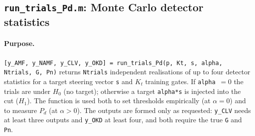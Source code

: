 \documentclass{article}
\begin{document}
\subsection{\texttt{run\_trials\_Pd.m}: Monte Carlo detector statistics}\label{sec:code:trials}

\paragraph{Purpose.} \texttt{[y\_AMF, y\_NAMF, y\_CLV, y\_OKD] = run\_trials\_Pd(p, Kt, s, alpha, Ntrials, G, Pn)} returns \texttt{Ntrials} independent realisations of up to four detector statistics for a target steering vector \texttt{s} and $K_t$ training gates. If \texttt{alpha}~$=0$ the trials are under $H_0$ (no target); otherwise a target \texttt{alpha*s} is injected into the \gls{cut} ($H_1$). The function is used both to set thresholds empirically (at $\alpha=0$) and to measure $P_d$ (at $\alpha>0$). The outputs are formed only as requested: \texttt{y\_CLV} needs at least three outputs and \texttt{y\_OKD} at least four, and both require the true \texttt{G} and \texttt{Pn}.
\end{document}

